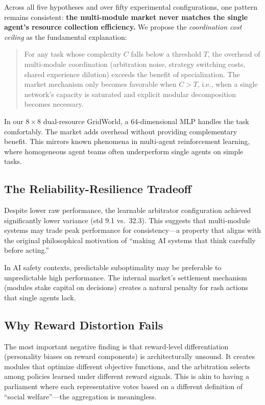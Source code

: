 \documentclass[a4paper,11pt]{article}
\begin{document}
Across all five hypotheses and over fifty experimental configurations, one pattern remains consistent: \textbf{the multi-module market never matches the single agent's resource collection efficiency.} We propose the \textit{coordination cost ceiling} as the fundamental explanation:

\begin{quote}
For any task whose complexity $C$ falls below a threshold $T$, the overhead of multi-module coordination (arbitration noise, strategy switching costs, shared experience dilution) exceeds the benefit of specialization. The market mechanism only becomes favorable when $C > T$, i.e., when a single network's capacity is saturated and explicit modular decomposition becomes necessary.
\end{quote}

In our $8\times8$ dual-resource GridWorld, a 64-dimensional MLP handles the task comfortably. The market adds overhead without providing complementary benefit. This mirrors known phenomena in multi-agent reinforcement learning, where homogeneous agent teams often underperform single agents on simple tasks.

\subsection{The Reliability-Resilience Tradeoff}

Despite lower raw performance, the learnable arbitrator configuration achieved significantly lower variance (std 9.1 vs.\ 32.3). This suggests that multi-module systems may trade peak performance for consistency---a property that aligns with the original philosophical motivation of ``making AI systems that think carefully before acting.''

In AI safety contexts, predictable suboptimality may be preferable to unpredictable high performance. The internal market's settlement mechanism (modules stake capital on decisions) creates a natural penalty for rash actions that single agents lack.

\subsection{Why Reward Distortion Fails}

The most important negative finding is that reward-level differentiation (personality biases on reward components) is architecturally unsound. It creates modules that optimize different objective functions, and the arbitration selects among policies learned under different reward signals. This is akin to having a parliament where each representative votes based on a different definition of ``social welfare''---the aggregation is meaningless.
\end{document}
